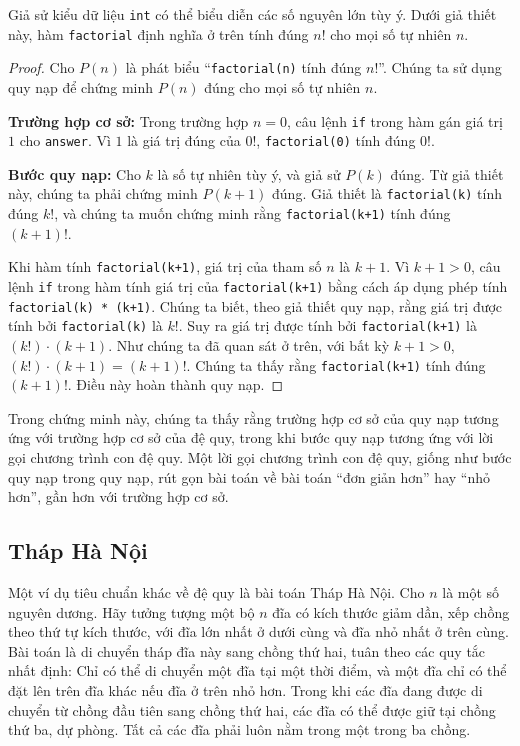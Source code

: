 \begin{theorem}
Giả sử kiểu dữ liệu \texttt{int} có thể biểu diễn các số nguyên lớn tùy ý. Dưới giả thiết này, hàm \texttt{factorial} định nghĩa ở trên tính đúng $n!$ cho mọi số tự nhiên $n$.
\end{theorem}

\begin{proof}
Cho $P(n)$ là phát biểu ``\texttt{factorial(n)} tính đúng $n!$''. Chúng ta sử dụng quy nạp để chứng minh $P(n)$ đúng cho mọi số tự nhiên $n$.

\textbf{Trường hợp cơ sở:} Trong trường hợp $n = 0$, câu lệnh \texttt{if} trong hàm gán giá trị $1$ cho \texttt{answer}. Vì $1$ là giá trị đúng của $0!$, \texttt{factorial(0)} tính đúng $0!$.

\textbf{Bước quy nạp:} Cho $k$ là số tự nhiên tùy ý, và giả sử $P(k)$ đúng. Từ giả thiết này, chúng ta phải chứng minh $P(k+1)$ đúng. Giả thiết là \texttt{factorial(k)} tính đúng $k!$, và chúng ta muốn chứng minh rằng \texttt{factorial(k+1)} tính đúng $(k+1)!$.

Khi hàm tính \texttt{factorial(k+1)}, giá trị của tham số $n$ là $k + 1$. Vì $k + 1 > 0$, câu lệnh \texttt{if} trong hàm tính giá trị của \texttt{factorial(k+1)} bằng cách áp dụng phép tính \texttt{factorial(k) * (k+1)}. Chúng ta biết, theo giả thiết quy nạp, rằng giá trị được tính bởi \texttt{factorial(k)} là $k!$. Suy ra giá trị được tính bởi \texttt{factorial(k+1)} là $(k!) \cdot (k + 1)$. Như chúng ta đã quan sát ở trên, với bất kỳ $k + 1 > 0$, $(k!) \cdot (k+1) = (k+1)!$. Chúng ta thấy rằng \texttt{factorial(k+1)} tính đúng $(k+1)!$. Điều này hoàn thành quy nạp.
\end{proof}

Trong chứng minh này, chúng ta thấy rằng trường hợp cơ sở của quy nạp tương ứng với trường hợp cơ sở của đệ quy, trong khi bước quy nạp tương ứng với lời gọi chương trình con đệ quy. Một lời gọi chương trình con đệ quy, giống như bước quy nạp trong quy nạp, rút gọn bài toán về bài toán ``đơn giản hơn'' hay ``nhỏ hơn'', gần hơn với trường hợp cơ sở.

\subsection{Tháp Hà Nội}

Một ví dụ tiêu chuẩn khác về đệ quy là bài toán Tháp Hà Nội. Cho $n$ là một số nguyên dương. Hãy tưởng tượng một bộ $n$ đĩa có kích thước giảm dần, xếp chồng theo thứ tự kích thước, với đĩa lớn nhất ở dưới cùng và đĩa nhỏ nhất ở trên cùng. Bài toán là di chuyển tháp đĩa này sang chồng thứ hai, tuân theo các quy tắc nhất định: Chỉ có thể di chuyển một đĩa tại một thời điểm, và một đĩa chỉ có thể đặt lên trên đĩa khác nếu đĩa ở trên nhỏ hơn. Trong khi các đĩa đang được di chuyển từ chồng đầu tiên sang chồng thứ hai, các đĩa có thể được giữ tại chồng thứ ba, dự phòng. Tất cả các đĩa phải luôn nằm trong một trong ba chồng.


